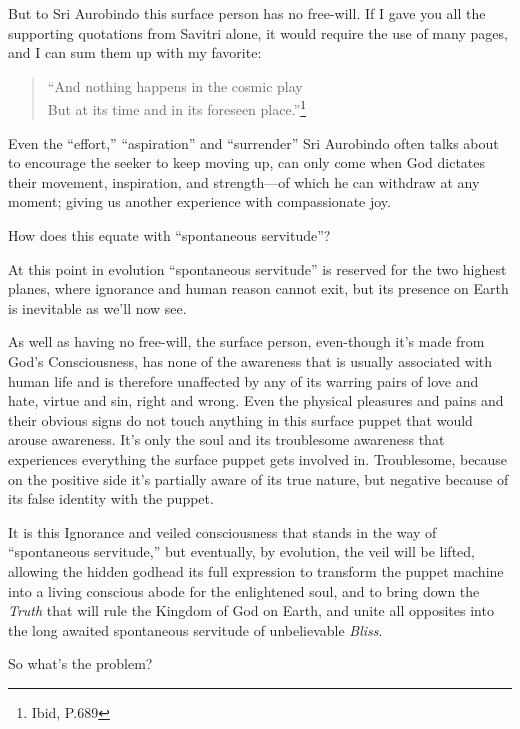 \documentclass[12pt,a4paper]{book}
\begin{document}
But to Sri Aurobindo this surface person has no free-will. If I gave
you all the supporting quotations from Savitri alone, it would require
the use of many pages, and I can sum them up with my favorite:

\begin{verse}
``And nothing happens in the cosmic play\\
But at its time and in its foreseen place.''\footnote{Ibid, P.689}
\end{verse}

Even the ``effort,'' ``aspiration'' and ``surrender'' Sri Aurobindo
often talks about to encourage the seeker to keep moving up, can only
come when God dictates their movement, inspiration, and strength---of
which he can withdraw at any moment; giving us another experience with
compassionate joy.

How does this equate with ``spontaneous servitude''?

At this point in evolution ``spontaneous servitude'' is reserved for
the two highest planes, where ignorance and human reason cannot exit,
but its presence on Earth is inevitable as we'll now see.

As well as having no free-will, the surface person, even-though it's
made from God's Consciousness, has none of the awareness that is
usually associated with human life and is therefore unaffected by any
of its warring pairs of love and hate, virtue and sin, right and
wrong. Even the physical pleasures and pains and their obvious signs
do not touch anything in this surface puppet that would arouse
awareness. It's only the soul and its troublesome awareness that
experiences everything the surface puppet gets involved
in. Troublesome, because on the positive side it's partially aware of
its true nature, but negative because of its false identity with the
puppet.

It is this Ignorance and veiled consciousness that stands in the way
of ``spontaneous servitude,'' but eventually, by evolution, the veil
will be lifted, allowing the hidden godhead its full expression to
transform the puppet machine into a living conscious abode for the
enlightened soul, and to bring down the \emph{Truth} that will rule
the Kingdom of God on Earth, and unite all opposites into the long
awaited spontaneous servitude of unbelievable \emph{Bliss}.

\noindent So what's the problem?
\end{document}
